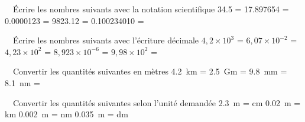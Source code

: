 \documentclass[../Cours.tex]{subfiles}
\begin{document}
\clearpage

\begin{questions}
    \exercice ~~Écrire les nombres suivants avec la notation scientifique\vspace{1ex}
    \subpart \num{34,5} = \vspace{1ex}
    \subpart \num{17,897654} = \vspace{1ex}
    \subpart \num{0,0000123} = \vspace{1ex}
    \subpart \num{9823,12} = \vspace{1ex}
    \subpart \num{0,100234010} = \vspace{1ex}
    
    \exercice ~~Écrire les nombres suivants avec l'écriture décimale\vspace{1ex}
    \subpart $4,2 \times 10^3$ = \vspace{1ex}
    \subpart $6,07 \times 10^{-2}$ = \vspace{1ex}
    \subpart $4,23 \times 10^2$ = \vspace{1ex}
    \subpart $8,923 \times 10^{-6}$ = \vspace{1ex}
    \subpart $9,98 \times 10^{2}$ = \vspace{1ex}
    
    \exercice ~~Convertir les quantités suivantes en mètres\vspace{1ex}
    \subpart \qty{4,2}{\kilo\metre} = \vspace{1ex}
    \subpart \qty{2,5}{\giga\metre} = \vspace{1ex}
    \subpart \qty{9,8}{\milli\metre} = \vspace{1ex}
    \subpart \qty{8,1}{\nano\metre} = \vspace{1ex}
    
    \exercice ~~Convertir les quantités suivantes selon l'unité demandée\vspace{1ex}
    \subpart \qty{2,3}{\metre} = \hspace{3cm} \unit{\centi\metre}\vspace{1ex}
    \subpart \qty{0,02}{\metre} = \hspace{3cm} \unit{\kilo\metre}\vspace{1ex}
    \subpart \qty{0,002}{\metre} = \hspace{3cm} \unit{\nano\metre}\vspace{1ex}
    \subpart \qty{0,035}{\metre} = \hspace{3cm} \unit{\deca\metre}\vspace{1ex}
    

\end{questions}
\end{document}
